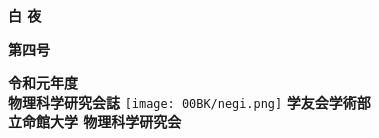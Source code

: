 \documentclass[10pt,b5paper,papersize,dvipdfmx]{jsbook}
\begin{document}
\thispagestyle{empty}

\begin{center}
  {\fontsize{90}{0}\selectfont \bfseries 白 夜}
%
  \begin{flushright}
    \vspace{-6zw}
    {\fontsize{18}{0}\selectfont \bfseries 第四号\hspace{.5zw}\vspace{-1zw}}
    \vspace{6zw}
  \end{flushright}
%
  \vspace{-1zw}
  {\fontsize{13}{0}\selectfont \bfseries 令和元年度 \\ 物理科学研究会誌}
%
  \vfill
  \texttt{[image: 00BK/negi.png]}
  \vfill
  {\fontsize{13}{0}\selectfont \bfseries 学友会学術部}\\
  \vspace{0.2zw}
  {\fontsize{13}{0}\selectfont \bfseries 立命館大学 物理科学研究会}
\end{center}
\end{document}
